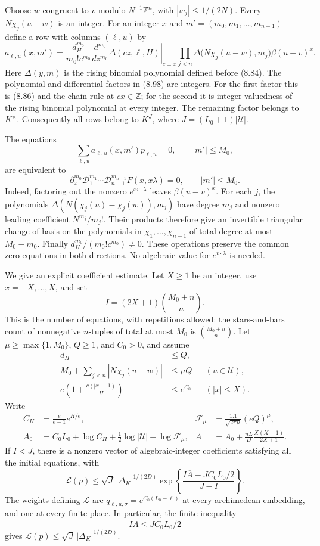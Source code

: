 \documentclass[
  11pt,
  a4paper,
]{article}
\begin{document}
Choose \(w\) congruent to \(v\) modulo \(N^{-1}\mathbb Z^n\), with
\(|w_j|\le1/(2N)\). Every \(N\chi_j(u-w)\) is an integer. For an integer
\(x\) and \(m'=(m_0,m_1,\ldots,m_{n-1})\) define a row with columns
\((\ell,u)\) by \[
a_{\ell,u}(x,m')=
\frac{d_H^{m_0}}{m_0!c^{m_0}}
\left.\frac{d^{m_0}}{dz^{m_0}}\Delta(cz,\ell,H)\right|_{z=x}
\prod_{j<n}\Delta\bigl(N\chi_j(u-w),m_j\bigr)
\beta(u-v)^x.
\tag{8.98}
\] Here \(\Delta(y,m)\) is the rising binomial polynomial defined before
(8.84). The polynomial and differential factors in (8.98) are integers.
For the first factor this is (8.86) and the chain rule at
\(cx\in\mathbb Z\); for the second it is integer-valuedness of the
rising binomial polynomial at every integer. The remaining factor
belongs to \(K^\times\). Consequently all rows belong to \(K^J\), where
\(J=(L_0+1)|\mathcal U|\).

The equations \[
\sum_{\ell,u}a_{\ell,u}(x,m')p_{\ell,u}=0,\qquad
|m'|\le M_0,
\tag{8.99}
\] are equivalent to \[
\partial_z^{m_0}\mathcal D_1^{m_1}\cdots
\mathcal D_{n-1}^{m_{n-1}}F(x,x\lambda)=0,\qquad |m'|\le M_0.
\] Indeed, factoring out the nonzero \(e^{xv\cdot\lambda}\) leaves
\(\beta(u-v)^x\). For each \(j\), the polynomials
\(\Delta(N(\chi_j(u)-\chi_j(w)),m_j)\) have degree \(m_j\) and nonzero
leading coefficient \(N^{m_j}/m_j!\). Their products therefore give an
invertible triangular change of basis on the polynomials in
\(\chi_1,\ldots,\chi_{n-1}\) of total degree at most \(M_0-m_0\).
Finally \(d_H^{m_0}/(m_0!c^{m_0})\ne0\). These operations preserve the
common zero equations in both directions. No algebraic value for
\(e^{v\cdot\lambda}\) is needed.

We give an explicit coefficient estimate. Let \(X\ge1\) be an integer,
use \(x=-X,\ldots,X\), and set \[
I=(2X+1)\binom{M_0+n}{n}.
\] This is the number of equations, with repetitions allowed: the
stars-and-bars count of nonnegative \(n\)-tuples of total at most
\(M_0\) is \(\binom{M_0+n}{n}\). Let \(\mu\ge\max\{1,M_0\}\), \(Q\ge1\),
and \(C_0>0\), and assume \[
\begin{aligned}
d_H&\le Q,\\
M_0+\sum_{j<n}|N\chi_j(u-w)|&\le\mu Q
&& (u\in\mathcal U),\\
e\left(1+\frac{c(|x|+1)}H\right)&\le e^{C_0}
&& (|x|\le X).
\end{aligned}
\tag{8.100}
\] Write \[
\begin{aligned}
C_H&=\frac e{e-1}e^{H/e},&
\mathcal F_\mu&=\frac{1.1}{\sqrt{2\pi\mu}}(eQ)^\mu,\\
A_0&=C_0L_0+\log C_H+\tfrac12\log|\mathcal U|
+\log\mathcal F_\mu,&
\overline A&=A_0+\frac{nL}{D}\frac{X(X+1)}{2X+1}.
\end{aligned}
\] If \(I<J\), there is a nonzero vector of algebraic-integer
coefficients satisfying all the initial equations, with \[
\mathcal L(p)\le
\sqrt J\,|\Delta_K|^{1/(2D)}
\exp\left\{\frac{I\overline A-JC_0L_0/2}{J-I}\right\}.
\tag{8.101}
\] The weights defining \(\mathcal L\) are
\(q_{\ell,u,\sigma}=e^{C_0(L_0-\ell)}\) at every archimedean embedding,
and one at every finite place. In particular, the finite inequality \[
I\overline A\le JC_0L_0/2
\tag{8.102}
\] gives \(\mathcal L(p)\le\sqrt J\,|\Delta_K|^{1/(2D)}\).
\end{document}

